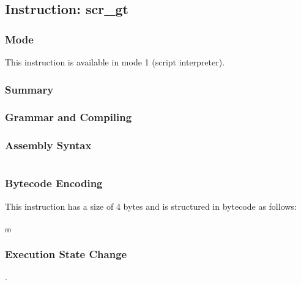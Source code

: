 \subsection{Instruction: scr\_gt}

\subsubsection{Mode}
This instruction is available in mode 1 (script interpreter).
\subsubsection{Summary}


\subsubsection{Grammar and Compiling}


\subsubsection{Assembly Syntax}

\begin{myquote}
\begin{verbatim}

\end{verbatim}
\end{myquote}

\subsubsection{Bytecode Encoding}

This instruction has a size of 4 bytes and is structured in bytecode as follows:

$_{00}$\ 


\subsubsection{Execution State Change}

.


